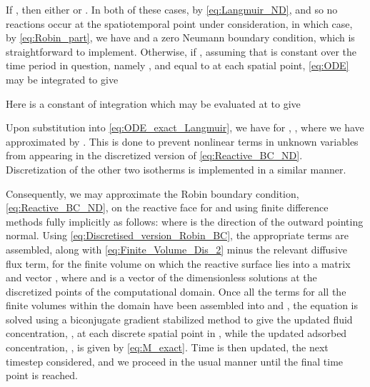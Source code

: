 \documentclass[preprint, 1p, authoryear]{elsarticle}
\begin{document}
If , then either  or . In both of these cases, by \eqref{eq:Langmuir_ND},    and so no reactions occur at the spatiotemporal point under consideration, in which case, by \eqref{eq:Robin_part}, we have  and a zero Neumann boundary condition,  which is straightforward to implement. 
Otherwise, if ,  assuming that  is constant over the time period in question, namely ,  and equal to  at each spatial point, \eqref{eq:ODE} may be   integrated to give 

Here   is a constant of integration which may be evaluated at  to give

Upon substitution into  \eqref{eq:ODE_exact_Langmuir}, we have
{\small
}for , , 
where we have approximated  by . This is done to prevent nonlinear terms in unknown variables from appearing in the discretized version of \eqref{eq:Reactive_BC_ND}.  Discretization of the other two isotherms is implemented in a similar manner. 

Consequently, we may approximate the Robin boundary condition, \eqref{eq:Reactive_BC_ND}, on the reactive face \mbox{} for  and  using finite difference methods fully implicitly as follows:
{\small
}where  is the direction of the outward pointing normal.  
 Using \eqref{eq:Discretised_version_Robin_BC}, the appropriate terms are assembled, along with \eqref{eq:Finite_Volume_Dis_2} minus the relevant diffusive flux term, for the finite volume on which the reactive surface lies into a matrix  and vector , where \mbox{} and  is a vector of the dimensionless solutions  at the discretized points of the computational domain.  Once all the terms for all the finite volumes within the domain have been assembled into  and , the equation  is solved using a biconjugate gradient stabilized method to give the updated fluid concentration, , at each discrete spatial point in , while the updated adsorbed concentration, , is given by \eqref{eq:M_exact}. Time is then updated, the next timestep considered, and we proceed in the usual manner until the final time point is reached. 
\end{document}
